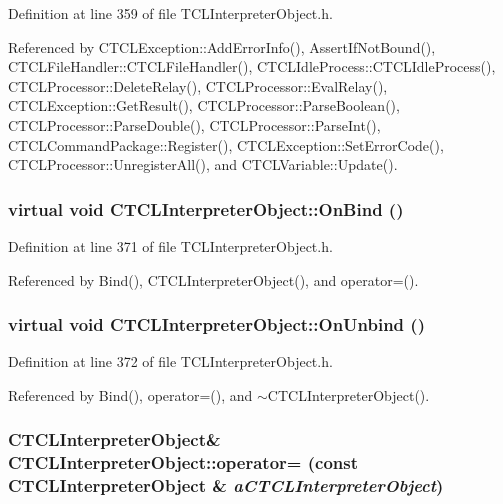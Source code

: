 Definition at line 359 of file TCLInterpreter\-Object.h.

Referenced by CTCLException::Add\-Error\-Info(), Assert\-If\-Not\-Bound(), CTCLFile\-Handler::CTCLFile\-Handler(), CTCLIdle\-Process::CTCLIdle\-Process(), CTCLProcessor::Delete\-Relay(), CTCLProcessor::Eval\-Relay(), CTCLException::Get\-Result(), CTCLProcessor::Parse\-Boolean(), CTCLProcessor::Parse\-Double(), CTCLProcessor::Parse\-Int(), CTCLCommand\-Package::Register(), CTCLException::Set\-Error\-Code(), CTCLProcessor::Unregister\-All(), and CTCLVariable::Update().
\subsubsection{\setlength{\rightskip}{0pt plus 5cm}virtual void CTCLInterpreter\-Object::On\-Bind ()\hspace{0.3cm}{\tt  [inline, protected, virtual]}}\label{classCTCLInterpreterObject_b0}




Definition at line 371 of file TCLInterpreter\-Object.h.

Referenced by Bind(), CTCLInterpreter\-Object(), and operator=().
\subsubsection{\setlength{\rightskip}{0pt plus 5cm}virtual void CTCLInterpreter\-Object::On\-Unbind ()\hspace{0.3cm}{\tt  [inline, protected, virtual]}}\label{classCTCLInterpreterObject_b1}




Definition at line 372 of file TCLInterpreter\-Object.h.

Referenced by Bind(), operator=(), and $\sim$CTCLInterpreter\-Object().
\subsubsection{\setlength{\rightskip}{0pt plus 5cm}CTCLInterpreter\-Object\& CTCLInterpreter\-Object::operator= (const CTCLInterpreter\-Object \& {\em a\-CTCLInterpreter\-Object})\hspace{0.3cm}{\tt  [inline]}}\label{classCTCLInterpreterObject_a4}




